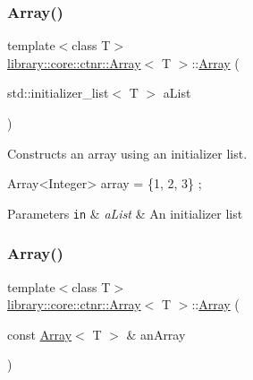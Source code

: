 \mbox{\label{classlibrary_1_1core_1_1ctnr_1_1_array_adcda1d4d28575b580a978406107febbb}} 
\subsubsection{\texorpdfstring{Array()}{Array()}\hspace{0.1cm}{\footnotesize\ttfamily [5/8]}}
{\footnotesize\ttfamily template$<$class T$>$ \\
\hyperlink{classlibrary_1_1core_1_1ctnr_1_1_array}{library\+::core\+::ctnr\+::\+Array}$<$ T $>$\+::\hyperlink{classlibrary_1_1core_1_1ctnr_1_1_array}{Array} (\begin{DoxyParamCaption}\item[{std\+::initializer\+\_\+list$<$ T $>$}]{a\+List }\end{DoxyParamCaption})}



Constructs an array using an initializer list. 


\begin{DoxyCode}
Array<Integer> array = \{1, 2, 3\} ;
\end{DoxyCode}



\begin{DoxyParams}[1]{Parameters}
\mbox{\tt in}  & {\em a\+List} & An initializer list \\
\hline
\end{DoxyParams}
\mbox{\label{classlibrary_1_1core_1_1ctnr_1_1_array_a1f218e9e89d4c2cfa84ed8c070894a9d}} 
\subsubsection{\texorpdfstring{Array()}{Array()}\hspace{0.1cm}{\footnotesize\ttfamily [6/8]}}
{\footnotesize\ttfamily template$<$class T$>$ \\
\hyperlink{classlibrary_1_1core_1_1ctnr_1_1_array}{library\+::core\+::ctnr\+::\+Array}$<$ T $>$\+::\hyperlink{classlibrary_1_1core_1_1ctnr_1_1_array}{Array} (\begin{DoxyParamCaption}\item[{const \hyperlink{classlibrary_1_1core_1_1ctnr_1_1_array}{Array}$<$ T $>$ \&}]{an\+Array }\end{DoxyParamCaption})\hspace{0.3cm}{\ttfamily [default]}}



